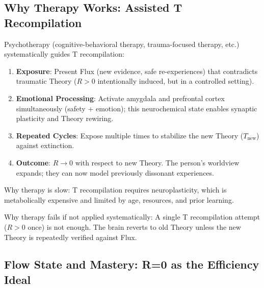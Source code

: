 \documentclass[11pt,oneside]{article}
\theoremstyle{definition}
\begin{document}
\subsection{Why Therapy Works: Assisted T Recompilation}

Psychotherapy (cognitive-behavioral therapy, trauma-focused therapy, etc.) systematically guides T recompilation:

\begin{enumerate}
  \item \textbf{Exposure}: Present Flux (new evidence, safe re-experiences) that contradicts traumatic Theory ($R > 0$ intentionally induced, but in a controlled setting).

  \item \textbf{Emotional Processing}: Activate amygdala and prefrontal cortex simultaneously (safety + emotion); this neurochemical state enables synaptic plasticity and Theory rewiring.

  \item \textbf{Repeated Cycles}: Expose multiple times to stabilize the new Theory ($T_{\text{new}}$) against extinction.

  \item \textbf{Outcome}: $R \to 0$ with respect to new Theory. The person's worldview expands; they can now model previously dissonant experiences.
\end{enumerate}

Why therapy is slow: T recompilation requires neuroplasticity, which is metabolically expensive and limited by age, resources, and prior learning.

Why therapy fails if not applied systematically: A single T recompilation attempt ($R > 0$ once) is not enough. The brain reverts to old Theory unless the new Theory is repeatedly verified against Flux.

\subsection{Flow State and Mastery: R=0 as the Efficiency Ideal}
\end{document}
